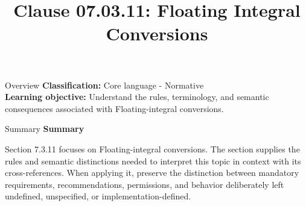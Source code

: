 \documentclass[10pt,letterpaper]{article}
\title{Clause 07.03.11: Floating Integral Conversions}
\author{}
\date{}
\begin{document}
\maketitle
\begin{CornellOverviewBox}{Overview}
\textbf{Classification:} Core language - Normative\\[2pt]
\textbf{Learning objective:} Understand the rules, terminology, and semantic consequences associated with Floating-integral conversions.
\end{CornellOverviewBox}\begin{CornellSummaryBox}{Summary}
{\sffamily\bfseries\color{Accent} Summary}\par\vspace{3pt}Section 7.3.11 focuses on Floating-integral conversions. The section supplies the rules and semantic distinctions needed to interpret this topic in context with its cross-references. When applying it, preserve the distinction between mandatory requirements, recommendations, permissions, and behavior deliberately left undefined, unspecified, or implementation-defined.
\end{CornellSummaryBox}
\end{document}
